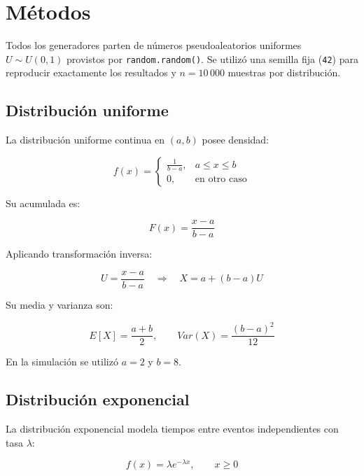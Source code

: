 \documentclass{article}
\begin{document}
\section{Métodos}

Todos los generadores parten de números pseudoaleatorios uniformes $U \sim
U(0,1)$ provistos por \texttt{random.random()}. Se utilizó una semilla fija
(\texttt{42}) para reproducir exactamente los resultados y $n=10\,000$ muestras
por distribución.

\subsection{Distribución uniforme}

La distribución uniforme continua en $(a,b)$ posee densidad:

\begin{equation}
    f(x) =
    \begin{cases}
        \frac{1}{b-a}, & a \leq x \leq b \\
        0, & \text{en otro caso}
    \end{cases}
\end{equation}

\noindent Su acumulada es:

\begin{equation}
    F(x) = \frac{x-a}{b-a}
\end{equation}

\noindent Aplicando transformación inversa:

\begin{equation}
    U = \frac{x-a}{b-a}
    \quad \Rightarrow \quad
    X = a + (b-a)U
\end{equation}

Su media y varianza son:

\begin{equation}
    E[X] = \frac{a+b}{2}, \qquad Var(X) = \frac{(b-a)^2}{12}
\end{equation}

En la simulación se utilizó $a=2$ y $b=8$.

\subsection{Distribución exponencial}

La distribución exponencial modela tiempos entre eventos independientes con
tasa $\lambda$:

\begin{equation}
    f(x)=\lambda e^{-\lambda x}, \qquad x \geq 0
\end{equation}
\end{document}
